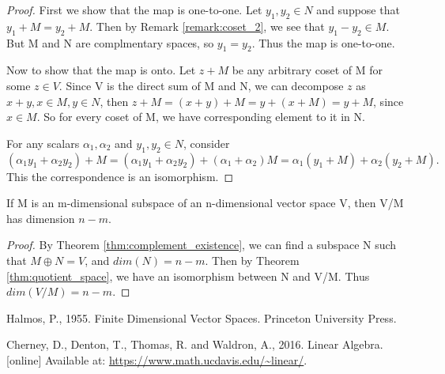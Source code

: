 \documentclass[11pt,a4paper]{article}
\begin{document}
\begin{proof}
    First we show that the map is one-to-one. Let $y_1,y_2\in N$ and suppose that $y_1+M=y_2+M$. Then by Remark \ref{remark:coset_2}, we see that $y_1-y_2\in M$. But M and N are complmentary spaces, so $y_1=y_2$. Thus the map is one-to-one.

    Now to show that the map is onto. Let $z+M$ be any arbitrary coset of M for some $z\in V$. Since V is the direct sum of M and N, we can decompose $z$ as $x+y,x\in M, y\in N$, then $z+M=(x+y)+M=y+(x+M)=y+M$, since $x\in M$. So for every coset of M, we have corresponding element to it in N. 

    For any scalars $\alpha_1,\alpha_2$ and $y_1,y_2\in N$, consider
    $$
        (\alpha_1y_1+\alpha_2y_2)+M=(\alpha_1y_1+\alpha_2y_2)+(\alpha_1+\alpha_2)M=\alpha_1(y_1+M)+\alpha_2(y_2+M).
    $$
    This the correspondence is an isomorphism.
\end{proof}

\begin{theorem}\label{thm:dim_quotient_space}
    If M is an m-dimensional subspace of an n-dimensional vector space V, then V/M has dimension $n-m$.
\end{theorem}

\begin{proof}
    By Theorem \ref{thm:complement_existence}, we can find a subspace N such that $M\oplus N=V$, and $dim(N)=n-m$. Then by Theorem \ref{thm:quotient_space}, we have an isomorphism between N and V/M. Thus $dim(V/M)=n-m$.
\end{proof}




\newpage

\begin{thebibliography}{9}
Halmos, P., 1955. Finite Dimensional Vector Spaces. Princeton University Press.

Cherney, D., Denton, T., Thomas, R. and Waldron, A., 2016. Linear Algebra. [online] Available at: \url{https://www.math.ucdavis.edu/~linear/}.


\end{thebibliography}
\end{document}
